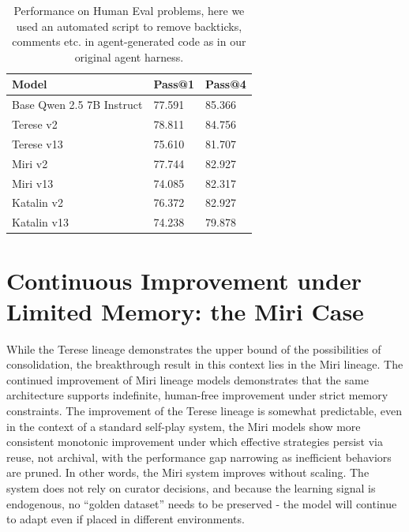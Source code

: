 \documentclass{article}
\begin{document}
\begin{table}[H]
    \centering
    \begin{tabular}{|l|l|l|}
        \hline
        \textbf{Model} & \textbf{Pass@1} & \textbf{Pass@4} \\ 
        \hline
        Base Qwen 2.5 7B Instruct & 77.591 & 85.366 \\ 
        \hline
        Terese v2 & 78.811 & 84.756 \\ 
        \hline
        Terese v13 & 75.610 & 81.707 \\ 
        \hline
        Miri v2 & 77.744 & 82.927 \\ 
        \hline
        Miri v13 & 74.085 & 82.317 \\ 
        \hline
        Katalin v2 & 76.372 & 82.927 \\ 
        \hline
        Katalin v13 & 74.238 & 79.878 \\ 
        \hline
    \end{tabular}
    \caption{Performance on Human Eval problems, here we used an automated script to remove backticks, comments etc. in agent-generated code as in our original agent harness.}
\end{table}

\section{Continuous Improvement under Limited Memory: the Miri Case}

While the Terese lineage demonstrates the upper bound of the possibilities of consolidation, the breakthrough result in this context lies in the Miri lineage. The continued improvement of Miri lineage models demonstrates that the same architecture supports indefinite, human-free improvement under strict memory constraints. The improvement of the Terese lineage is somewhat predictable, even in the context of a standard self-play system, the Miri models show more consistent monotonic improvement under which effective strategies persist via reuse, not archival, with the performance gap narrowing as inefficient behaviors are pruned. In other words, the Miri system improves without scaling. The system does not rely on curator decisions, and because the learning signal is endogenous, no “golden dataset” needs to be preserved - the model will continue to adapt even if placed in different environments. 
\end{document}

